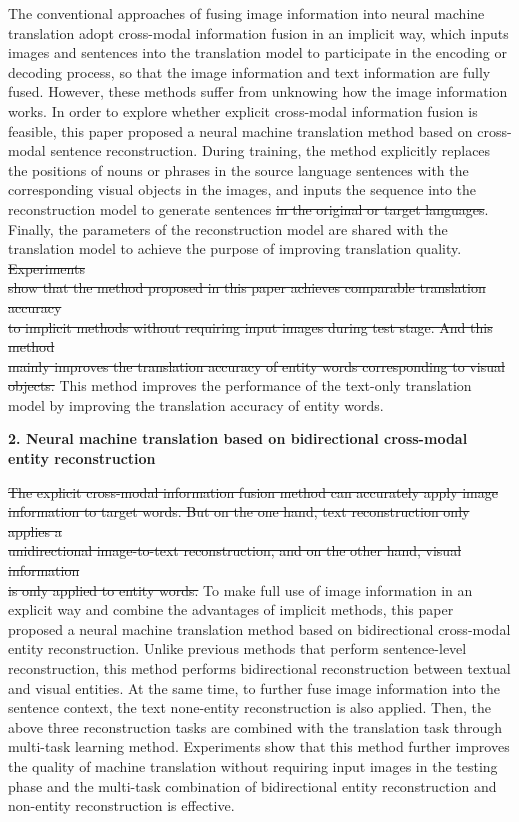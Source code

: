 The conventional approaches of fusing image information into neural machine translation adopt cross-modal information fusion in an implicit way, which inputs images and sentences into the translation model to participate in the encoding or decoding process, so that the image information and text information are fully fused. However, these methods suffer from unknowing how the image information works. In order to explore whether explicit cross-modal information fusion is feasible, this paper proposed a neural machine translation method based on cross-modal sentence reconstruction. During training, the method explicitly replaces the positions of nouns or phrases in the source language sentences with the corresponding visual objects in the images, and inputs the sequence into the reconstruction model to generate sentences \sout{in the original or target languages}. Finally, the parameters of the reconstruction model are shared with the translation model to achieve the purpose of improving translation quality. \sout{Experiments} \\ \sout{show that the method proposed in this paper achieves comparable translation accuracy} \\ \sout{to implicit methods without requiring input images during test stage. And this method} \\ \sout{mainly improves the translation accuracy of entity words corresponding to visual objects. } This method improves the performance of the text-only translation model by improving the translation accuracy of entity words.

\textbf{2. Neural machine translation based on bidirectional cross-modal entity reconstruction}

\sout{The explicit cross-modal information fusion method can accurately apply image} \\ \sout{information to target words. But on the one hand, text reconstruction only applies a} \\ \sout{unidirectional image-to-text reconstruction, and on the other hand, visual information} \\ \sout{is only applied to entity words.} To make full use of image information in an explicit way and combine the advantages of implicit methods, this paper proposed a neural machine translation method based on bidirectional cross-modal entity reconstruction. Unlike previous methods that perform sentence-level reconstruction, this method performs bidirectional reconstruction between textual and visual entities. At the same time, to further fuse image information into the sentence context, the text none-entity reconstruction is also applied. Then, the above three reconstruction tasks are combined with the translation task through multi-task learning method. Experiments show that this method further improves the quality of machine translation without requiring input images in the testing phase and the multi-task combination of bidirectional entity reconstruction and non-entity reconstruction is effective.

